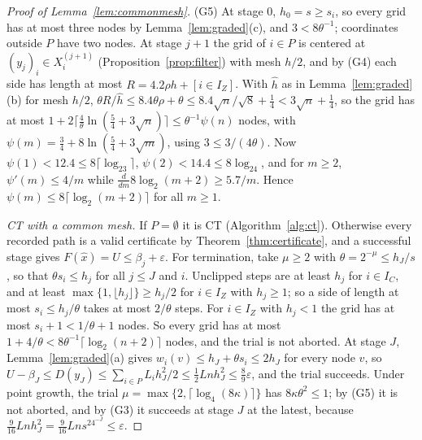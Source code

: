 \begin{proof}[Proof of Lemma~\ref{lem:commonmesh}]
(G5) At stage $0$, $h_0=s\ge s_i$, so every grid has at most three nodes by
Lemma~\ref{lem:graded}(c), and $3<8\theta^{-1}$; coordinates outside $P$ have
two nodes. At stage $j+1$ the grid of $i\in P$ is centered at
$(y_j)_i\in X_i^{(j+1)}$ (Proposition~\ref{prop:filter}) with mesh $h/2$, and
by (G4) each side has length at most $R=4.2\rho h+[i\in I_Z]$. With $\hat h$
as in Lemma~\ref{lem:graded}(b) for mesh $h/2$,
$\theta R/\hat h\le8.4\theta\rho+\theta\le8.4\sqrt n/\sqrt8+\frac14
<3\sqrt n+\frac14$, so the grid has at most
$1+2\lceil\frac4\theta\ln(\frac54+3\sqrt n)\rceil\le\theta^{-1}\psi(n)$
nodes, with $\psi(m)=\frac34+8\ln(\frac54+3\sqrt m)$, using
$3\le3/(4\theta)$. Now $\psi(1)<12.4\le8\lceil\log_23\rceil$,
$\psi(2)<14.4\le8\log_24$, and for $m\ge2$, $\psi'(m)\le4/m$ while
$\frac{d}{dm}8\log_2(m+2)\ge5.7/m$. Hence
$\psi(m)\le8\lceil\log_2(m+2)\rceil$ for all $m\ge1$.

\emph{CT with a common mesh.} If $P=\emptyset$ it is CT
(Algorithm~\ref{alg:ct}). Otherwise every
recorded path is a valid certificate by Theorem~\ref{thm:certificate}, and a
successful stage gives $F(\hat x)=U\le\beta_j+\varepsilon$. For termination,
take $\mu\ge2$ with $\theta=2^{-\mu}\le h_J/s$, so that $\theta s_i\le h_j$
for all $j\le J$ and $i$. Unclipped steps are at least $h_j$ for
$i\in I_C$, and at least $\max\{1,\lfloor h_j\rfloor\}\ge h_j/2$ for
$i\in I_Z$ with $h_j\ge1$; so a side of length at most $s_i\le h_j/\theta$
takes at most $2/\theta$ steps. For $i\in I_Z$ with $h_j<1$ the grid has at
most $s_i+1<1/\theta+1$ nodes. So every grid has at most
$1+4/\theta<8\theta^{-1}\lceil\log_2(n+2)\rceil$ nodes, and the trial is not
aborted. At stage $J$, Lemma~\ref{lem:graded}(a) gives
$w_i(v)\le h_J+\theta s_i\le2h_J$ for every node $v$, so
$U-\beta_J\le D(y_J)\le\sum_{i\in P}L_ih_J^2/2\le\frac12Lnh_J^2
\le\frac89\varepsilon$, and the trial succeeds. Under point growth, the
trial $\mu=\max\{2,\lceil\log_4(8\kappa)\rceil\}$ has $8\kappa\theta^2\le1$;
by (G5) it is not aborted, and by (G3) it succeeds at stage $J$ at the latest,
because $\frac9{16}Lnh_J^2=\frac9{16}Lns^24^{-J}\le\varepsilon$.
\end{proof}

